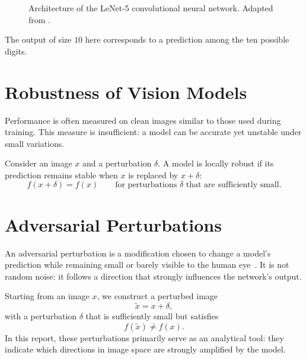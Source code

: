 \begin{figure}[H]
{
    }
    \caption{Architecture of the LeNet-5 convolutional neural network. Adapted from \cite{lecun1998gradient}.}
    \label{fig:lenet5}
\end{figure}

The output of size $10$ here corresponds to a prediction among the ten possible digits.

\section{Robustness of Vision Models}

Performance is often measured on clean images similar to those used during training. This measure is insufficient: a model can be accurate yet unstable under small variations.

Consider an image $x$ and a perturbation $\delta$. A model is locally robust if its prediction remains stable when $x$ is replaced by $x+\delta$:
\[
    f(x+\delta) = f(x)
    \qquad \text{for perturbations } \delta \text{ that are sufficiently small.}
\]

\section{Adversarial Perturbations}
\label{sec:perturbation_adversariale}

An adversarial perturbation is a modification chosen to change a model's prediction while remaining small or barely visible to the human eye~\cite{szegedy2014intriguing}. It is not random noise: it follows a direction that strongly influences the network's output.

Starting from an image $x$, we construct a perturbed image
\[
    \widetilde{x} = x + \delta,
\]
with a perturbation $\delta$ that is sufficiently small but satisfies
\[
    f(\widetilde{x}) \neq f(x).
\]
In this report, these perturbations primarily serve as an analytical tool: they indicate which directions in image space are strongly amplified by the model.

